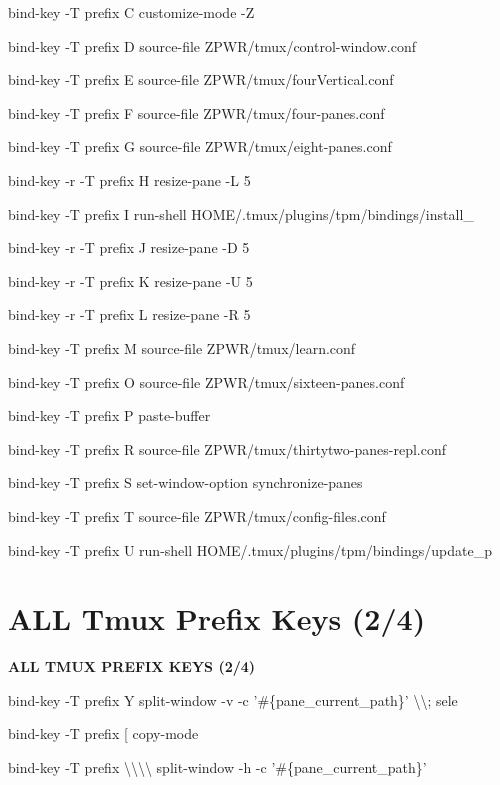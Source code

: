 \documentclass[11pt,a4paper,twoside]{book}
\begin{document}
bind-key  -T prefix  C  customize-mode -Z

bind-key  -T prefix  D  source-file ZPWR/tmux/control-window.conf

bind-key  -T prefix  E  source-file ZPWR/tmux/fourVertical.conf

bind-key  -T prefix  F  source-file ZPWR/tmux/four-panes.conf

bind-key  -T prefix  G  source-file ZPWR/tmux/eight-panes.conf

bind-key -r -T prefix  H  resize-pane -L 5

bind-key  -T prefix  I  run-shell HOME/.tmux/plugins/tpm/bindings/install\_

bind-key -r -T prefix  J  resize-pane -D 5

bind-key -r -T prefix  K  resize-pane -U 5

bind-key -r -T prefix  L  resize-pane -R 5

bind-key  -T prefix  M  source-file ZPWR/tmux/learn.conf

bind-key  -T prefix  O  source-file ZPWR/tmux/sixteen-panes.conf

bind-key  -T prefix  P  paste-buffer

bind-key  -T prefix  R  source-file ZPWR/tmux/thirtytwo-panes-repl.conf

bind-key  -T prefix  S  set-window-option synchronize-panes

bind-key  -T prefix  T  source-file ZPWR/tmux/config-files.conf

bind-key  -T prefix  U  run-shell HOME/.tmux/plugins/tpm/bindings/update\_p


\vspace{16pt}

\section{ALL Tmux Prefix Keys (2/4)}


\vspace{10pt}
{\large\bfseries\color{neoncyan} ALL TMUX PREFIX KEYS (2/4)}\vspace{6pt}

bind-key  -T prefix  Y  split-window -v -c '\#\{pane\_current\_path\}' \textbackslash{}\textbackslash{}; sele

bind-key  -T prefix  [  copy-mode

bind-key  -T prefix  \textbackslash{}\textbackslash{}\textbackslash{}\textbackslash{}  split-window -h -c '\#\{pane\_current\_path\}'
\end{document}
